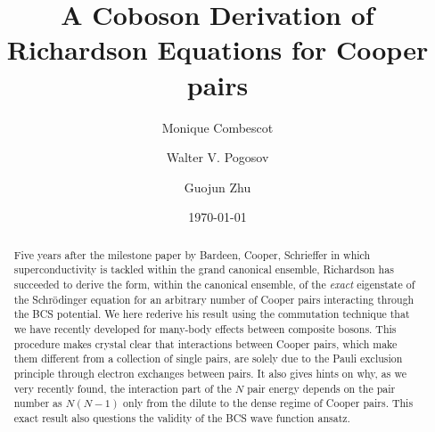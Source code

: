 \documentclass[aps,prb,amsmath,amssymb,superscriptaddress,twocolumn]{revtex4-1}
\begin{document}

\title{A Coboson Derivation of Richardson Equations for Cooper pairs}


\author{Monique Combescot}
\author{Walter V. Pogosov}
\author{Guojun Zhu}



\date{\today}

\begin{abstract}
Five years after the milestone paper by Bardeen, Cooper, Schrieffer in which superconductivity is tackled within the grand canonical ensemble, Richardson has succeeded to derive the form, within the canonical ensemble, of the \textit{exact} eigenstate of the Schr\"{o}dinger equation for an arbitrary number of Cooper pairs interacting through the BCS potential.  We here rederive his result using the commutation technique that we have recently developed for many-body effects between composite bosons.  This procedure makes crystal clear that interactions between Cooper pairs, which make them different from a collection of single pairs, are solely due to the Pauli exclusion principle through electron exchanges between pairs. It also gives hints on why, as we very recently found, the interaction part of the $N$ pair energy depends on the pair number as $N(N-1)$ only from the dilute to the dense regime of Cooper pairs. This  exact result also questions the validity of the BCS wave function ansatz. 
\end{abstract}
\end{document}
